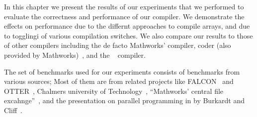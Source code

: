 In this chapter we present the results of our experiments that we performed to
evaluate the correctness and performance of our compiler. We demonstrate the
effects on performance due to the differnt approaches to compile arrays, and due
to togglingi of various compilation switches. We also compare our results to
those of other \matlab compilers including the de facto Mathworks' compiler,
\matlab coder (also provided by Mathworks)~\cite{}, and the \mctwofor~\cite{}
compiler. 

The set of benchmarks used for our experiments consists of benchmarks from
various sources; Most of them are from related projects like FALCON~\cite{} and
OTTER~\cite{}, Chalmers university of Technology~\cite{}, ``Mathworks' central
file excahnge''~\cite{}, and the presentation on parallel programming in \matlab
by Burkardt and Cliff~\cite{}. 

